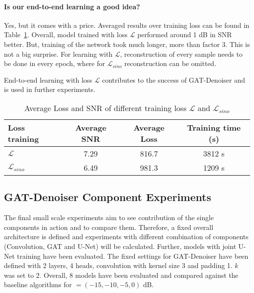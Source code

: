 \paragraph{Is our end-to-end learning a good idea?}
Yes, but it comes with a price. 
Averaged results over training loss can be found in Table~\ref{tab:loss_sino_reco}. 
Overall, model trained with loss $\mathcal{L} $ performed around 1 dB in SNR better.
But, training of the network took much longer, more than factor 3. 
This is not a big surprise. For learning with $\mathcal{L} $, reconstruction of every sample
needs to be done in every epoch, where for $\mathcal{L}_{sino}$ reconstruction can be omitted.

\begin{tcolorbox}[colback=red!5!white,colframe=red!75!black]
  End-to-end learning with loss $\mathcal{L} $ contributes to the success of GAT-Denoiser and 
   is used in further experiments.
\end{tcolorbox}


\begin{table}[H]
  \centering
    \begin{tabular}{l|ccc}
    \toprule
    \textbf{Loss training} & \textbf{Average SNR} & \textbf{Average Loss} & \textbf{Training time (s)}  \\ 
    \midrule
    $\mathcal{L} $         &  7.29    &  816.7  & 3812 s \\ \hline
    $\mathcal{L}_{sino}$   &  6.49    &  981.3  & 1209 s \\ \hline
    \midrule
    \end{tabular}
  \caption{Average Loss and SNR of different training loss $\mathcal{L}$ and $\mathcal{L}_{sino}$}
  \label{tab:loss_sino_reco}
\end{table}


\subsection{GAT-Denoiser Component Experiments}

The final small scale experiments aim to see contribution of the single components in action and 
to compare them.
Therefore, a fixed overall architecture is defined and experiments
with different combination of components (Convolution, GAT and U-Net) will be calculated.
Further, models with joint U-Net training have been evaluated.
The fixed settings for GAT-Denoiser have been defined with 2 layers, 4 heads, convolution with 
kernel size 3 and padding 1. $k$ was set to 2.
Overall, 8 models have been evaluated and compared against the baseline algorithms for  \snry $ = (-15,-10,-5,0) $ dB.


